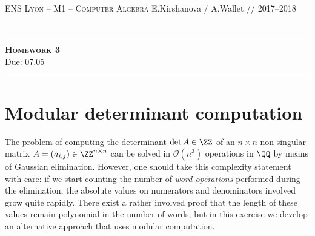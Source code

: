 \documentclass[11pt]{exam}
\theoremstyle{definition}
\begin{document}
{\noindent
   \textsc{ENS Lyon --  M1 -- Computer Algebra}
 \hfill { E.Kirshanova / A.Wallet // 2017--2018\\
   	}\\
  }
  \hrule
  \begin{center}
    {\Large\textbf{
   \textsc{Homework 3} \\[5pt]
    }
	Due:  07.05
	} 
  \end{center}
  \hrule \vspace{5mm}

\thispagestyle{empty}

\vspace{0.2cm}

\section{Modular determinant computation}

The problem of computing the determinant $\det A \in \ZZ$ of an $n \times n$ non-singular matrix $A=(a_{i,j}) \in \ZZ^{n \times n}$ can be solved in $\mathcal{O}(n^3)$ operations in $\QQ$ by means of Gaussian elimination. However, one should take this complexity statement with care: if we start counting the number of \emph{word operations} performed during the elimination, the absolute values on numerators and denominators involved grow quite rapidly. There exist a rather involved proof that the length of these values remain polynomial in the number of words, but in this exercise we develop an alternative approach that uses modular computation.
\end{document}
